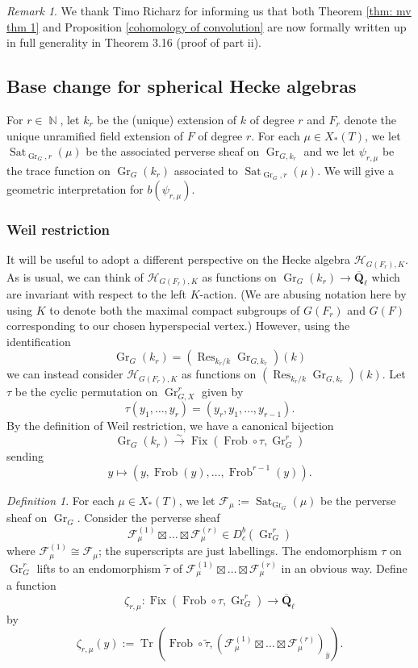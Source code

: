 \documentclass[reqno]{amsart}
\numberwithin{equation}{section}
\newcommand{\wt}[1]{\widetilde{#1}}
\newcommand{\Q}{\mathbf{Q}}
\newcommand{\ol}[1]{\overline{#1}}
\newcommand{\Cal}[1]{\mathcal{#1}}
\newcommand{\co}{\colon}
\DeclareMathOperator{\Frob}{Frob}
\DeclareMathOperator{\N}{\mathbb{N}}
\DeclareMathOperator{\Tr}{Tr}
\DeclareMathOperator{\Res}{Res}
\DeclareMathOperator{\Gr}{Gr}
\DeclareMathOperator{\Fix}{Fix}
\DeclareMathOperator{\Sat}{Sat}
\theoremstyle{remark}
\newtheorem{remark}[thm]{Remark}
\newtheorem{defn}[thm]{Definition}
\numberwithin{equation}{section}
\begin{document}
\begin{remark}
We thank Timo Richarz for informing us that both Theorem \ref{thm: mv thm 1} and Proposition \ref{cohomology of convolution} are now formally written up in full generality in \cite{HRpre} Theorem 3.16 (proof of part ii). 
\end{remark}


\subsection{Base change for spherical Hecke algebras}\label{subsec: BC spherical HA}




For $r \in \N$, let $k_r$ be the (unique) extension of $k$ of degree $r$ and $F_r$ denote the unique unramified field extension of $F$ of degree $r$. For each $\mu \in X_*(T)$, we let $\Sat_{\Gr_G, r}(\mu)$ be the associated perverse sheaf on $\Gr_{G,k_r}$ and we let $\psi_{r, \mu}$ be the trace function on $\Gr_{G}(k_r)$ associated to $\Sat_{\Gr_G, r}(\mu)$. We will give a geometric interpretation for $b(\psi_{r, \mu})$. 

\subsubsection{Weil restriction} It will be useful to adopt a different perspective on the Hecke algebra $\Cal{H}_{G(F_r), K}$. As is usual, we can think of $\Cal{H}_{G(F_r), K}$ as functions on $\Gr_{G}(k_r) \rightarrow \ol{\Q}_{\ell}$ which are invariant with respect to the left $K$-action. (We are abusing notation here by using $K$ to denote both the maximal compact subgroups of $G(F_r)$ and $G(F)$ corresponding to our chosen hyperspecial vertex.) However, using the identification 
\[
\Gr_{G}(k_r) = ( \Res_{k_r/k} \Gr_{G, k_r}) (k)
\]
we can instead consider $\Cal{H}_{G(F_r), K}$ as functions on $ ( \Res_{k_r/k} \Gr_{G, k_r}) (k)$. Let $\tau$ be the cyclic permutation on $\Gr_{G,X}^r$ given by 
\[
\tau(y_1, \ldots, y_r) = (y_r, y_1, \ldots, y_{r-1}).
\]
By the definition of Weil restriction, we have a canonical bijection
\[
\Gr_{G}(k_r) \xrightarrow{\sim} \Fix(\Frob \circ \tau, \Gr_{G}^r)
\]
sending 
\[
y \mapsto  (y, \Frob(y), \ldots, \Frob^{r-1}(y)).
\]

\begin{defn}For each $\mu \in X_*(T)$, we let $\Cal{F}_{\mu} := \Sat_{\Gr_G}(\mu)$ be the perverse sheaf on $\Gr_{G}$. Consider the perverse sheaf 
\[
\Cal{F}_{\mu}^{(1)} \boxtimes \ldots \boxtimes \Cal{F}_{\mu}^{(r)} \in D_c^b(\Gr_{G}^r)
\]
where $\Cal{F}_{\mu}^{(1)} \cong \Cal{F}_{\mu}$; the superscripts are just labellings. The endomorphism $\tau$ on $\Gr_{G}^r$ lifts to an endomorphism $\wt{\tau}$ of $\Cal{F}_{\mu}^{(1)} \boxtimes \ldots \boxtimes \Cal{F}_{\mu}^{(r)}$ in an obvious way. Define a function
\[
\zeta_{r,\mu} \co \Fix(\Frob \circ \tau, \Gr_{G}^r) \rightarrow \ol{\Q}_{\ell}
\]
by 
\[
\zeta_{r,\mu}(y)   := \Tr(\Frob \circ \wt{\tau}, (\Cal{F}_{\mu}^{(1)} \boxtimes \ldots \boxtimes \Cal{F}_{\mu}^{(r)})_{\ol{y}}).
\] 
\end{defn}
\end{document}
